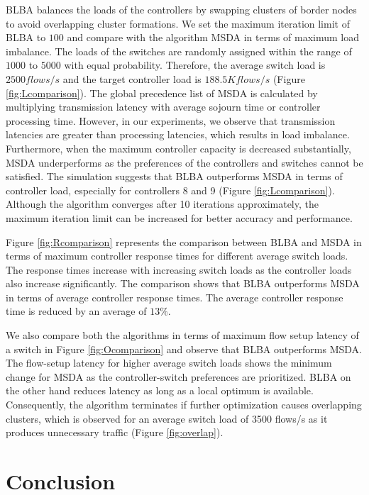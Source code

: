 \documentclass[final,5p,times]{cas-dc}
\begin{document}
	BLBA balances the loads of the controllers by swapping clusters of border nodes to avoid overlapping cluster formations. We set the maximum iteration limit of BLBA to $100$ and compare with the algorithm MSDA \cite{filali2018sdn, fragiadakis2016matching} in terms of maximum load imbalance. The loads of the switches are randomly assigned within the range of $1000$ to $5000$ with equal probability. Therefore, the average switch load is $2500 flows/s$ and the target controller load is $188.5K flows/s$ (Figure \ref{fig:Lcomparison}). The global precedence list of MSDA is calculated by multiplying transmission latency with average sojourn time or controller processing time. However, in our experiments, we observe that transmission latencies are greater than processing latencies, which results in load imbalance. Furthermore, when the maximum controller capacity is decreased substantially, MSDA underperforms as the preferences of the controllers and switches cannot be satisfied. The simulation suggests that BLBA outperforms MSDA in terms of controller load, especially for controllers 8 and 9 (Figure \ref{fig:Lcomparison}). Although the algorithm converges after 10 iterations approximately, the maximum iteration limit can be increased for better accuracy and performance.
	
	Figure \ref{fig:Rcomparison} represents the comparison between BLBA and MSDA in terms of maximum controller response times for different average switch loads. The response times increase with increasing switch loads as the controller loads also increase significantly. The comparison shows that BLBA outperforms MSDA in terms of average controller response times. The average controller response time is reduced by an average of $13\%$.
	
	We also compare both the algorithms in terms of maximum flow setup latency of a switch in Figure \ref{fig:Ocomparison} and observe that BLBA outperforms MSDA. The flow-setup latency for higher average switch loads shows the minimum change for MSDA as the controller-switch preferences are prioritized. BLBA on the other hand reduces latency as long as a local optimum is available. Consequently, the algorithm terminates if further optimization causes overlapping clusters, which is observed for an average switch load of 3500 flows/s as it produces unnecessary traffic (Figure \ref{fig:overlap}).
	
	\section{Conclusion} \label{conclusion}
	
\end{document}
